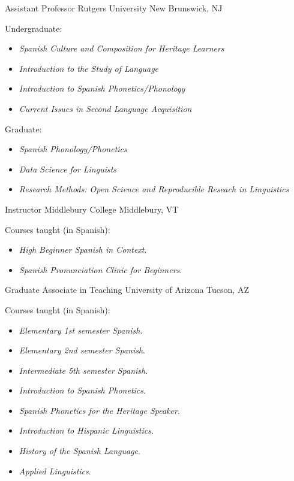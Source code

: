 \documentclass[11pt,letterpaper]{moderncv}
\begin{document}
        {Assistant Professor}
        {Rutgers University}
        {New Brunswick, NJ}
        {}
        {
        Undergraduate:
        \begin{itemize}
            \item[] \small \emph{Spanish Culture and Composition for Heritage Learners}
            \item[] \small \emph{Introduction to the Study of Language}
            \item[] \small \emph{Introduction to Spanish Phonetics/Phonology}
            \item[] \small \emph{Current Issues in Second Language Acquisition}
        \end{itemize}
        Graduate:
        \begin{itemize}
            \item[] \small \emph{Spanish Phonology/Phonetics}
            \item[] \small \emph{Data Science for Linguists}
            \item[] \small \emph{Research Methods: Open Science and Reproducible 
                                 Reseach in Linguistics}
        \end{itemize}
        }
        {Instructor}
        {Middlebury College}
        {Middlebury, VT}
        {}
        {Courses taught (in Spanish):
        \begin{itemize}
          \item[] \small \emph{High Beginner Spanish in Context}.\vspace{-.03in}
          \item[] \small \emph{Spanish Pronunciation Clinic for Beginners}.
        \end{itemize}}
        {Graduate Associate in Teaching}
        {University of Arizona}
        {Tucson, AZ}
        {}
        {Courses taught (in Spanish):
        \begin{itemize}
          \item[] \small \emph{Elementary 1st semester Spanish}.\vspace{-.03in}
          \item[] \small \emph{Elementary 2nd semester Spanish}.\vspace{-.03in}
          \item[] \small \emph{Intermediate 5th semester Spanish}.\vspace{-.03in}
          \item[] \small \emph{Introduction to Spanish Phonetics}.\vspace{-.03in}
          \item[] \small \emph{Spanish Phonetics for the Heritage Speaker}.\vspace{-.03in}
          \item[] \small \emph{Introduction to Hispanic Linguistics}.\vspace{-.03in}
          \item[] \small \emph{History of the Spanish Language}.\vspace{-.03in}
          \item[] \small \emph{Applied Linguistics}.
        \end{itemize}}
\end{document}
